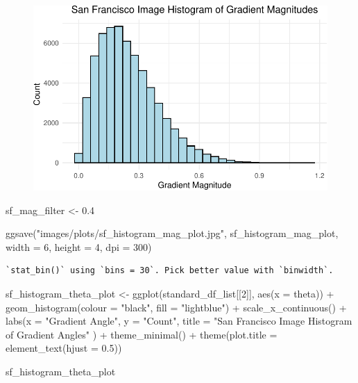 \documentclass[
  letterpaper,
]{report}
\newenvironment{Shaded}{\begin{snugshade}}{\end{snugshade}}
\newcommand{\AttributeTok}[1]{\textcolor[rgb]{0.40,0.45,0.13}{#1}}
\newcommand{\DecValTok}[1]{\textcolor[rgb]{0.68,0.00,0.00}{#1}}
\newcommand{\FloatTok}[1]{\textcolor[rgb]{0.68,0.00,0.00}{#1}}
\newcommand{\FunctionTok}[1]{\textcolor[rgb]{0.28,0.35,0.67}{#1}}
\newcommand{\NormalTok}[1]{\textcolor[rgb]{0.00,0.23,0.31}{#1}}
\newcommand{\OtherTok}[1]{\textcolor[rgb]{0.00,0.23,0.31}{#1}}
\newcommand{\SpecialCharTok}[1]{\textcolor[rgb]{0.37,0.37,0.37}{#1}}
\newcommand{\StringTok}[1]{\textcolor[rgb]{0.13,0.47,0.30}{#1}}
\begin{document}
\begin{figure}[H]

{\centering \includegraphics{results_files/figure-pdf/unnamed-chunk-10-1.pdf}

}

\end{figure}

\begin{Shaded}
\begin{Highlighting}[]
\NormalTok{sf\_mag\_filter }\OtherTok{\textless{}{-}} \FloatTok{0.4}

\FunctionTok{ggsave}\NormalTok{(}\StringTok{"images/plots/sf\_histogram\_mag\_plot.jpg"}\NormalTok{, sf\_histogram\_mag\_plot, }\AttributeTok{width =} \DecValTok{6}\NormalTok{, }\AttributeTok{height =} \DecValTok{4}\NormalTok{, }\AttributeTok{dpi =} \DecValTok{300}\NormalTok{)}
\end{Highlighting}
\end{Shaded}

\begin{verbatim}
`stat_bin()` using `bins = 30`. Pick better value with `binwidth`.
\end{verbatim}

\begin{Shaded}
\begin{Highlighting}[]
\NormalTok{sf\_histogram\_theta\_plot }\OtherTok{\textless{}{-}}
  \FunctionTok{ggplot}\NormalTok{(standard\_df\_list[[}\DecValTok{2}\NormalTok{]], }
         \FunctionTok{aes}\NormalTok{(}\AttributeTok{x =}\NormalTok{ theta)) }\SpecialCharTok{+}
  \FunctionTok{geom\_histogram}\NormalTok{(}\AttributeTok{colour =} \StringTok{"black"}\NormalTok{, }\AttributeTok{fill =} \StringTok{"lightblue"}\NormalTok{) }\SpecialCharTok{+}
  \FunctionTok{scale\_x\_continuous}\NormalTok{() }\SpecialCharTok{+} 
  \FunctionTok{labs}\NormalTok{(}\AttributeTok{x =} \StringTok{"Gradient Angle"}\NormalTok{, }
       \AttributeTok{y =} \StringTok{"Count"}\NormalTok{, }
       \AttributeTok{title =} \StringTok{"San Francisco Image Histogram of Gradient Angles"}
\NormalTok{       ) }\SpecialCharTok{+}
  \FunctionTok{theme\_minimal}\NormalTok{() }\SpecialCharTok{+}
  \FunctionTok{theme}\NormalTok{(}\AttributeTok{plot.title =} \FunctionTok{element\_text}\NormalTok{(}\AttributeTok{hjust =} \FloatTok{0.5}\NormalTok{))}

\NormalTok{sf\_histogram\_theta\_plot}
\end{Highlighting}
\end{Shaded}
\end{document}
